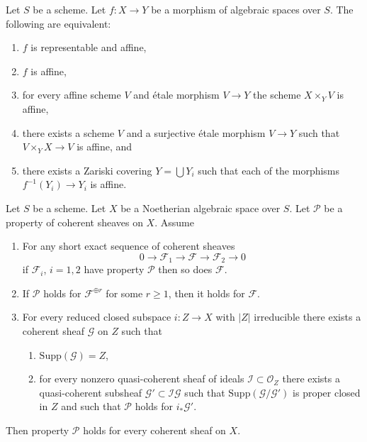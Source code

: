 \begin{lemma}
\label{lemma-affine-local}
Let $S$ be a scheme.
Let $f : X \to Y$ be a morphism of algebraic spaces over $S$.
The following are equivalent:
\begin{enumerate}
\item $f$ is representable and affine,
\item $f$ is affine,
\item for every affine scheme $V$ and \'etale morphism $V \to Y$
the scheme $X \times_Y V$ is affine,
\item there exists a scheme $V$ and a surjective \'etale morphism
$V \to Y$ such that $V \times_Y X \to V$ is affine, and
\item there exists a Zariski covering $Y = \bigcup Y_i$ such
that each of the morphisms $f^{-1}(Y_i) \to Y_i$ is affine.
\end{enumerate}
\end{lemma}

\begin{lemma}
\label{lemma-property-higher-rank-cohomological}
Let $S$ be a scheme. Let $X$ be a Noetherian algebraic space over $S$.
Let $\mathcal{P}$ be a property of coherent sheaves on $X$. Assume
\begin{enumerate}
\item For any short exact sequence of coherent sheaves
$$
0 \to \mathcal{F}_1 \to \mathcal{F} \to \mathcal{F}_2 \to 0
$$
if $\mathcal{F}_i$, $i = 1, 2$ have property $\mathcal{P}$
then so does $\mathcal{F}$.
\item If $\mathcal{P}$ holds for $\mathcal{F}^{\oplus r}$ for
some $r \geq 1$, then it holds for $\mathcal{F}$.
\item For every reduced closed subspace $i : Z \to X$ with
$|Z|$ irreducible there exists a coherent sheaf $\mathcal{G}$ on $Z$
such that
\begin{enumerate}
\item $\text{Supp}(\mathcal{G}) = Z$,
\item for every nonzero quasi-coherent sheaf of ideals
$\mathcal{I} \subset \mathcal{O}_Z$ there exists a quasi-coherent
subsheaf $\mathcal{G}' \subset \mathcal{I}\mathcal{G}$ such that
$\text{Supp}(\mathcal{G}/\mathcal{G}')$ is proper closed in $Z$
and such that $\mathcal{P}$ holds for $i_*\mathcal{G}'$.
\end{enumerate}
\end{enumerate}
Then property $\mathcal{P}$ holds for every coherent sheaf on $X$.
\end{lemma}

